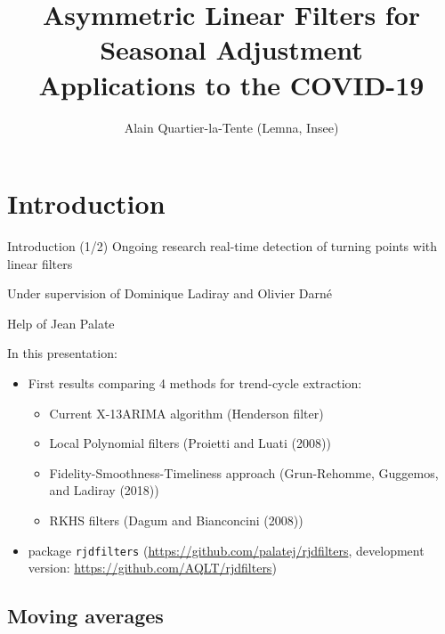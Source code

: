 \documentclass[10pt,xcolor=table,color={dvipsnames,usenames},ignorenonframetext,usepdftitle=false,english]{beamer}
\title{Asymmetric Linear Filters for Seasonal Adjustment\\
Applications to the COVID-19}
\author{Alain Quartier-la-Tente (Lemna, Insee)}
\date{}
\providecommand{\tightlist}{%
  \setlength{\parskip}{0pt}
  }
\newcommand\1{\mathds{1}}
\begin{document}
\begin{frame}
\titlepage
\end{frame}

\hypertarget{introduction}{%
\section{Introduction}\label{introduction}}

\begin{frame}[fragile]{Introduction (1/2)}
\protect\hypertarget{introduction-12}{}
Ongoing research real-time detection of turning points with linear
filters

 Under supervision of Dominique Ladiray and
Olivier Darné

 Help of Jean Palate

\pause

In this presentation:

\begin{itemize}
\item
  First results comparing 4 methods for trend-cycle extraction:

  \begin{itemize}
  \item
    Current X-13ARIMA algorithm (Henderson filter)
  \item
    Local Polynomial filters (Proietti and Luati (2008))
  \item
    Fidelity-Smoothness-Timeliness approach (Grun-Rehomme, Guggemos, and
    Ladiray (2018))
  \item
    RKHS filters (Dagum and Bianconcini (2008))
  \end{itemize}
\end{itemize}

\pause

\begin{itemize}
\tightlist
\item
   package \texttt{rjdfilters}
  (\url{https://github.com/palatej/rjdfilters}, development version:
  \url{https://github.com/AQLT/rjdfilters})
\end{itemize}
\end{frame}

\hypertarget{moving-averages}{%
\subsection{Moving averages}\label{moving-averages}}
\end{document}
